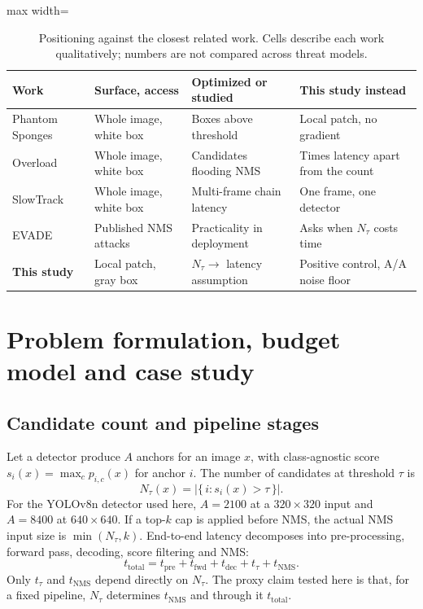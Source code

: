 \documentclass[a4paper,fleqn]{cas-dc}
\newcommand{\Ntau}{N_{\tau}}
\begin{document}
\begin{table}[pos=!t]
\centering\small
\caption{Positioning against the closest related work. Cells describe each work qualitatively; numbers are not compared across threat models.}
\label{tab:related}
\begin{adjustbox}{max width=\textwidth}
\begin{tabular}{@{}llll@{}}
\toprule
Work & Surface, access & Optimized or studied & This study instead \\
\midrule
Phantom Sponges \cite{phantom2023} & Whole image, white box & Boxes above threshold & Local patch, no gradient \\
Overload \cite{overload2024} & Whole image, white box & Candidates flooding NMS & Times latency apart from the count \\
SlowTrack \cite{slowtrack2024} & Whole image, white box & Multi-frame chain latency & One frame, one detector \\
EVADE \cite{evade2025} & Published NMS attacks & Practicality in deployment & Asks when $\Ntau$ costs time \\
\textbf{This study} & Local patch, gray box & $\Ntau \to$ latency assumption & Positive control, A/A noise floor \\
\bottomrule
\end{tabular}
\end{adjustbox}
\end{table}

\section{Problem formulation, budget model and case study}
\label{sec:formal}
\subsection{Candidate count and pipeline stages}
Let a detector produce $A$ anchors for an image $x$, with class-agnostic score $s_i(x)=\max_c p_{i,c}(x)$ for anchor $i$. The number of candidates at threshold $\tau$ is
\begin{equation}
\Ntau(x)=\bigl|\{\, i : s_i(x) > \tau \,\}\bigr| .
\end{equation}
For the YOLOv8n detector used here, $A=2100$ at a $320\times320$ input and $A=8400$ at $640\times640$. If a top-$k$ cap is applied before NMS, the actual NMS input size is $\min(\Ntau,k)$. End-to-end latency decomposes into pre-processing, forward pass, decoding, score filtering and NMS:
\begin{equation}
t_{\mathrm{total}} = t_{\mathrm{pre}} + t_{\mathrm{fwd}} + t_{\mathrm{dec}} + t_{\tau} + t_{\mathrm{NMS}} .
\end{equation}
Only $t_{\tau}$ and $t_{\mathrm{NMS}}$ depend directly on $\Ntau$. The proxy claim tested here is that, for a fixed pipeline, $\Ntau$ determines $t_{\mathrm{NMS}}$ and through it $t_{\mathrm{total}}$.
\end{document}
